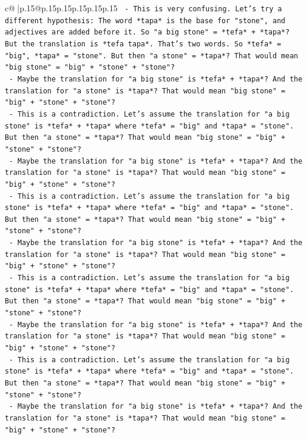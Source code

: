 \documentclass{article}
\begin{document}
{\begin{supertabular}{c@{$\;$}|p{.15\linewidth}@{}p{.15\linewidth}p{.15\linewidth}p{.15\linewidth}p{.15\linewidth}p{.15\linewidth}}
{{{\texttt{        {-} This is very confusing. Let's try a different hypothesis: The word *tapa* is the base for "stone", and adjectives are added before it. So "a big stone" = *tefa* + *tapa*? But the translation is *tefa tapa*. That's two words. So *tefa* = "big", *tapa* = "stone". But then "a stone" = *tapa*? That would mean "big stone" = "big" + "stone" + "stone"?} \\
\texttt{        {-} Maybe the translation for "a big stone" is *tefa* + *tapa*? And the translation for "a stone" is *tapa*? That would mean "big stone" = "big" + "stone" + "stone"?} \\
\texttt{        {-} This is a contradiction. Let's assume the translation for "a big stone" is *tefa* + *tapa* where *tefa* = "big" and *tapa* = "stone". But then "a stone" = *tapa*? That would mean "big stone" = "big" + "stone" + "stone"?} \\
\texttt{        {-} Maybe the translation for "a big stone" is *tefa* + *tapa*? And the translation for "a stone" is *tapa*? That would mean "big stone" = "big" + "stone" + "stone"?} \\
\texttt{        {-} This is a contradiction. Let's assume the translation for "a big stone" is *tefa* + *tapa* where *tefa* = "big" and *tapa* = "stone". But then "a stone" = *tapa*? That would mean "big stone" = "big" + "stone" + "stone"?} \\
\texttt{        {-} Maybe the translation for "a big stone" is *tefa* + *tapa*? And the translation for "a stone" is *tapa*? That would mean "big stone" = "big" + "stone" + "stone"?} \\
\texttt{        {-} This is a contradiction. Let's assume the translation for "a big stone" is *tefa* + *tapa* where *tefa* = "big" and *tapa* = "stone". But then "a stone" = *tapa*? That would mean "big stone" = "big" + "stone" + "stone"?} \\
\texttt{        {-} Maybe the translation for "a big stone" is *tefa* + *tapa*? And the translation for "a stone" is *tapa*? That would mean "big stone" = "big" + "stone" + "stone"?} \\
\texttt{        {-} This is a contradiction. Let's assume the translation for "a big stone" is *tefa* + *tapa* where *tefa* = "big" and *tapa* = "stone". But then "a stone" = *tapa*? That would mean "big stone" = "big" + "stone" + "stone"?} \\
\texttt{        {-} Maybe the translation for "a big stone" is *tefa* + *tapa*? And the translation for "a stone" is *tapa*? That would mean "big stone" = "big" + "stone" + "stone"?} \\
}}}
\end{supertabular}}
\end{document}
